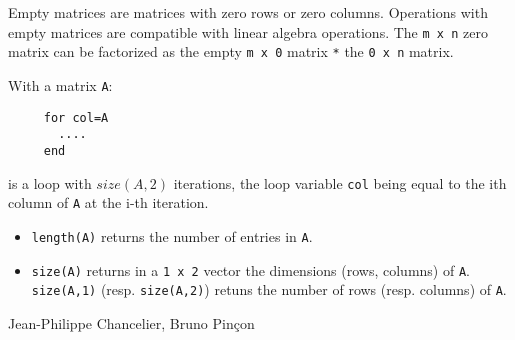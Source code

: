 Empty matrices are matrices with zero rows or zero columns. Operations with empty matrices
are compatible with linear algebra operations. The \verb+m x n+ zero matrix can be 
factorized as the empty \verb+m x 0+ matrix \verb+*+ the \verb+0 x n+ matrix. 

With a matrix \verb+A+:
\begin{verbatim}
     for col=A
       ....
     end
\end{verbatim} 
is a loop with $size(A,2)$ iterations, the loop 
variable  \verb+col+ being equal to the ith column of \verb+A+ at the i-th iteration.

\begin{itemize}
   \item \verb+length(A)+ returns the number of entries in \verb+A+.
   \item \verb+size(A)+ returns in a \verb+1 x 2+ vector the dimensions (rows, columns)
of \verb+A+. \verb+size(A,1)+ (resp. \verb+size(A,2)+) retuns the number of rows 
(resp. columns) of \verb+A+.
\end{itemize}


\begin{manseealso}

\end{manseealso}

\begin{authors}
   Jean-Philippe Chancelier, Bruno Pin\c{c}on
\end{authors}
